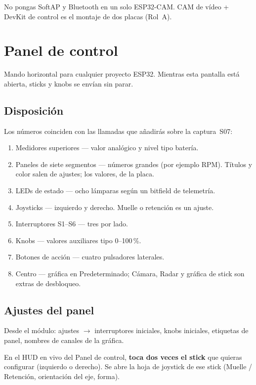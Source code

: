 \documentclass[12pt,a4paper]{article}
\begin{document}
No pongas SoftAP y Bluetooth en un solo ESP32-CAM.
CAM de vídeo + DevKit de control es el montaje de dos placas (Rol~A).

\section{Panel de control}
\label{sec:panel}

Mando horizontal para cualquier proyecto ESP32.
Mientras esta pantalla está abierta, sticks y knobs se envían sin parar.

\subsection{Disposición}

Los números coinciden con las llamadas que añadirás sobre la captura~S07:

\begin{enumerate}[leftmargin=1.5cm]
  \item Medidores superiores --- valor analógico y nivel tipo batería.
  \item Paneles de siete segmentos --- números grandes (por ejemplo RPM).
        Títulos y color salen de ajustes; los valores, de la placa.
  \item LEDs de estado --- ocho lámparas según un bitfield de telemetría.
  \item Joysticks --- izquierdo y derecho. Muelle o retención es un ajuste.
  \item Interruptores S1--S6 --- tres por lado.
  \item Knobs --- valores auxiliares tipo 0--100\,\%.
  \item Botones de acción --- cuatro pulsadores laterales.
  \item Centro --- gráfica en Predeterminado; Cámara, Radar y gráfica de
        stick son extras de desbloqueo.
\end{enumerate}

\subsection{Ajustes del panel}

Desde el módulo: ajustes $\rightarrow$ interruptores iniciales,
knobs iniciales, etiquetas de panel, nombres de canales de la gráfica.

En el HUD en vivo del Panel de control, \textbf{toca dos veces el stick}
que quieras configurar (izquierdo o derecho). Se abre la hoja de joystick
de ese stick (Muelle / Retención, orientación del eje, forma).
\end{document}
